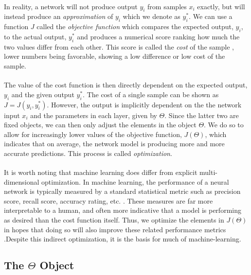\documentclass[12pt,letterpaper]{article}
\begin{document}
\paragraph*{}In reality, a network will not produce output $y_i$ from samples $x_i$ exactly, but will instead produce an \textit{approximation} of $y_i$ which we denote as $y_i^*$. We can use a function $J$ called the \textit{objective function} which compares the expected output, $y_i$, to the actual output, $y_i^*$ and produces a numerical score ranking how much the two values differ from each other. This score is called the \textit{cost} of the sample \cite{James}, lower numbers being favorable, showing a low difference or low cost of the sample.

\paragraph*{}The value of the cost function is then directly dependent on the expected output, $y_i$ and the given output $y_i^*$. The cost of a single sample can be shown as $J = J( y_i , y_i^* )$. However, the output is implicitly dependent on the the network input $x_i$ and the parameters in each layer, given by $\Theta$. Since the latter two are fixed objects, we can then only adjust the elements in the object $\Theta$. We do so to allow for increasingly lower values of the objective function, $J(\Theta)$, which indicates that on average, the network model is producing more and more accurate predictions. This process is called \textit{optimization}. 

\paragraph*{}It is worth noting that machine learning does differ from explicit multi-dimensional optimization. In machine learning, the performance of a neural network is typically measured by a standard statistical metric such as precision score, recall score, accuracy rating, etc. \cite{Geron}. These measures are far more interpretable to a human, and often more indicative that a model is performing as desired than the cost function itself. Thus, we optimize the elements in $J(\Theta)$ in hopes that doing so will also improve these related performance metrics \cite{Goodfellow}.Despite this indirect optimization, it is the basis for much of machine-learning.

\subsection{The $\Theta$ Object}
\end{document}
